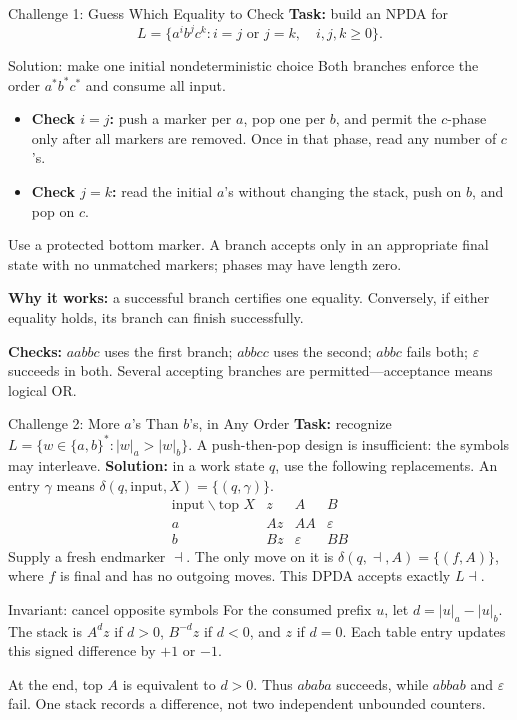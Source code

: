 \documentclass[10pt]{beamer}
\begin{document}
\begin{frame}{Challenge 1: Guess Which Equality to Check}
  \small
  \textbf{Task:} build an NPDA for
  \[
    L=\{a^i b^j c^k:i=j\text{ or }j=k,\quad i,j,k\ge0\}.
  \]
  \pause
  \begin{block}{Solution: make one initial nondeterministic choice}
    Both branches enforce the order $a^*b^*c^*$ and consume all input.
    \begin{itemize}
      \item \textbf{Check $i=j$:} push a marker per $a$, pop one per $b$,
        and permit the $c$-phase only after all markers are removed.
        Once in that phase, read any number of $c$'s.
      \item \textbf{Check $j=k$:} read the initial $a$'s without changing
        the stack, push on $b$, and pop on $c$.
    \end{itemize}
    Use a protected bottom marker. A branch accepts only in an appropriate
    final state with no unmatched markers; phases may have length zero.
  \end{block}
  \pause
  \textbf{Why it works:} a successful branch certifies one equality.
  Conversely, if either equality holds, its branch can finish successfully.
  \par\smallskip
  \textbf{Checks:} $aabbc$ uses the first branch; $abbcc$ uses the second;
  $abbc$ fails both; $\varepsilon$ succeeds in both.
  Several accepting branches are permitted---acceptance means logical OR.
\end{frame}

\begin{frame}{Challenge 2: More $a$'s Than $b$'s, in Any Order}
  \small
  \textbf{Task:} recognize $L=\{w\in\{a,b\}^*:|w|_a>|w|_b\}$.
  A push-then-pop design is insufficient: the symbols may interleave.
  \pause
  \textbf{Solution:} in a work state $q$, use the following replacements.
  An entry $\gamma$ means $\delta(q,\text{input},X)=\{(q,\gamma)\}$.
  \[
    \begin{array}{c|ccc}
      \text{input}\backslash\text{top }X & z&A&B\\\hline
      a&Az&AA&\varepsilon\\
      b&Bz&\varepsilon&BB
    \end{array}
  \]
  Supply a fresh endmarker $\dashv$. The only move on it is
  $\delta(q,\dashv,A)=\{(f,A)\}$, where $f$ is final and has no outgoing moves.
  This DPDA accepts exactly $L\dashv$.
  \pause
  \begin{block}{Invariant: cancel opposite symbols}
    For the consumed prefix $u$, let $d=|u|_a-|u|_b$.
    The stack is $A^dz$ if $d>0$, $B^{-d}z$ if $d<0$, and $z$ if $d=0$.
    Each table entry updates this signed difference by $+1$ or $-1$.
  \end{block}
  At the end, top $A$ is equivalent to $d>0$. Thus $ababa$ succeeds,
  while $abbab$ and $\varepsilon$ fail. One stack records a difference,
  not two independent unbounded counters.
\end{frame}
\end{document}
